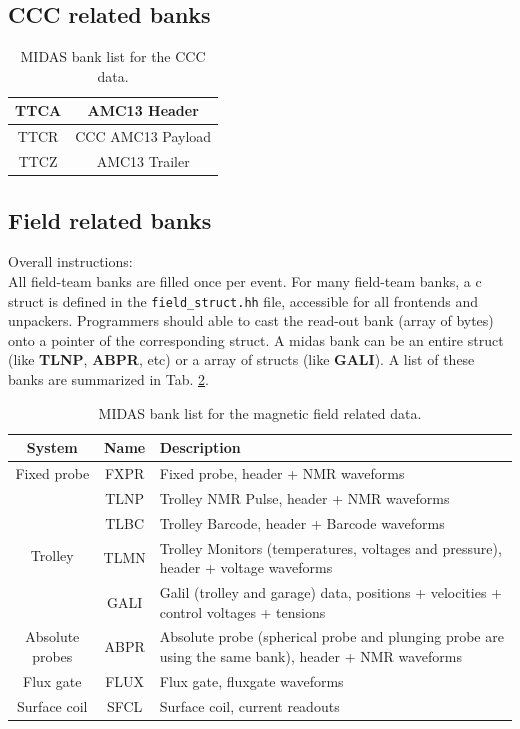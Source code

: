 \subsection{CCC related banks}

\begin{table}[htbp]
\centering
\caption{MIDAS bank list for the CCC data.}
\begin{tabular}{|c|c|}
\hline 
TTCA & AMC13 Header \\
\hline
TTCR & CCC AMC13 Payload\\
\hline
TTCZ & AMC13 Trailer \\
\hline
\end{tabular} 
\label{tab:ccctable}
\end{table}


\subsection{Field related banks}

Overall instructions: \\

All field-team banks are filled once per event.
For many field-team banks, a c struct is defined in the \verb+field_struct.hh+ file, accessible for all frontends and unpackers. Programmers should able to cast the read-out bank (array of bytes) onto a pointer of the corresponding struct. A midas bank can be an entire struct (like \textbf{TLNP}, \textbf{ABPR}, etc) or a array of structs (like \textbf{GALI}). A list of these banks are summarized in Tab. \ref{tab:fieldtable}.


\begin{table}[htbp]
\centering
\caption{MIDAS bank list for the magnetic field related data.}
\begin{tabular}{|c|c|p{11cm}|}
\hline
System & Name & Description \\
\hline
Fixed probe & FXPR & Fixed probe, header + NMR waveforms \\
\hline
\multirow{4}{*}{Trolley} & TLNP & Trolley NMR Pulse, header + NMR waveforms\\
\cline{2-3}
& TLBC &  Trolley Barcode, header + Barcode waveforms \\
\cline{2-3}
& TLMN & Trolley Monitors (temperatures, voltages and pressure), header + voltage waveforms \\
\cline{2-3}
& GALI &  Galil (trolley and garage) data, positions + velocities + control voltages + tensions\\
\hline
Absolute probes &  ABPR &
Absolute probe (spherical probe and plunging probe are using the same bank), header + NMR waveforms \\ 
\hline
Flux gate & FLUX & Flux gate, fluxgate waveforms \\
\hline
Surface coil & SFCL & Surface coil, current readouts\\
\hline
\end{tabular} 
\label{tab:fieldtable}
\end{table}

